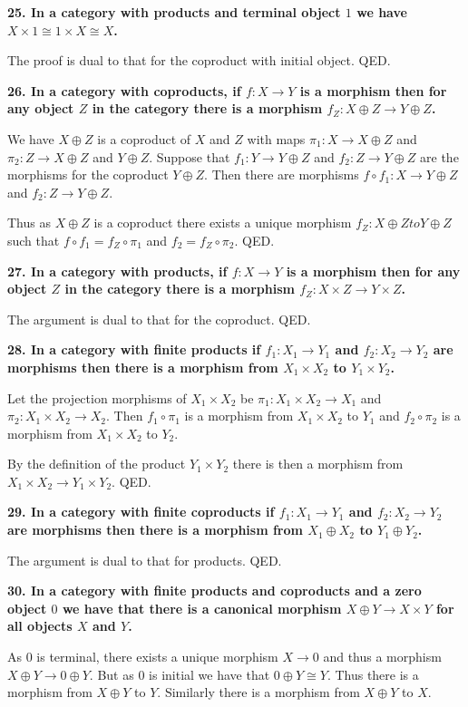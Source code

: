 \documentclass[12pt]{article}
\begin{document}
\textbf{25. In a category with products and terminal object $1$ we have $X\times 1 \cong 1 \times X \cong X$.}

The proof is dual to that for the coproduct with initial object. QED.

\textbf{26. In a category with coproducts, if $f : X \to Y$ is a morphism then for any object $Z$ in the category there is a morphism $f_Z : X\oplus Z \to Y\oplus Z$.}

We have $X\oplus Z$ is a coproduct of $X$ and $Z$ with maps $\pi_1 : X \to X\oplus Z$ and $\pi_2 : Z \to X\oplus Z$ and $Y\oplus Z$. Suppose that $f_1 : Y \to Y\oplus Z$ and $f_2 : Z \to Y\oplus Z$ are the morphisms for the coproduct $Y\oplus Z$. Then there are morphisms $f\circ f_1 : X \to Y\oplus Z$ and $f_2 : Z\to Y\oplus Z$.

Thus as $X\oplus Z$ is a coproduct there exists a unique morphism $f_Z : X\oplus Z to Y\oplus Z$ such that $f\circ f_1 = f_Z\circ \pi_1$ and $f_2 = f_Z\circ \pi_2$. QED.

\textbf{27. In a category with products, if $f : X \to Y$ is a morphism then for any object $Z$ in the category there is a morphism $f_Z : X\times Z \to Y\times Z$.}

The argument is dual to that for the coproduct. QED.

\textbf{28. In a category with finite products if $f_1 : X_1 \to Y_1$ and $f_2 : X_2 \to Y_2$ are morphisms then there is a morphism from $X_1\times X_2$ to $Y_1\times Y_2$.}

Let the projection morphisms of $X_1\times X_2$ be $\pi_1 : X_1\times X_2 \to X_1$ and $\pi_2 : X_1\times X_2 \to X_2$. Then $f_1\circ \pi_1$ is a morphism from $X_1\times X_2$ to $Y_1$ and $f_2\circ \pi_2$ is a morphism from $X_1\times X_2$ to $Y_2$.

By the definition of the product $Y_1\times Y_2$ there is then a morphism from $X_1\times X_2 \to Y_1\times Y_2$. QED.

\textbf{29. In a category with finite coproducts if $f_1 : X_1 \to Y_1$ and $f_2 : X_2 \to Y_2$ are morphisms then there is a morphism from $X_1\oplus X_2$ to $Y_1\oplus Y_2$.}

The argument is dual to that for products. QED.

\textbf{30. In a category with finite products and coproducts and a zero object $0$ we have that there is a canonical morphism $X\oplus Y \to X\times Y$ for all objects $X$ and $Y$.}

As $0$ is terminal, there exists a unique morphism $X \to 0$ and thus a morphism $X\oplus Y \to 0\oplus Y$. But as $0$ is initial we have that $0\oplus Y \cong Y$. Thus there is a morphism from $X\oplus Y$ to $Y$. Similarly there is a morphism from $X\oplus Y$ to $X$.
\end{document}
